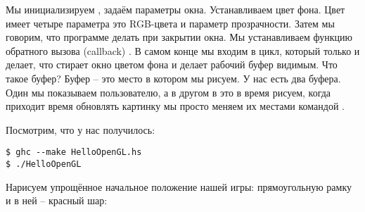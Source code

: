 Мы инициализируем , задаём параметры окна. Устанавливаем цвет
фона. Цвет имеет четыре параметра это RGB-цвета и параметр прозрачности.
Затем мы говорим, что программе делать при закрытии окна. Мы
устанавливаем функцию обратного вызова (callback)
. В самом конце мы входим в цикл, который только
и делает, что стирает окно цветом фона и делает рабочий буфер видимым.
Что такое буфер? Буфер -- это место в котором мы рисуем. У нас есть два
буфера. Один мы показываем пользователю, а в другом в это в время
рисуем, когда приходит время обновлять картинку мы просто меняем их
местами командой .

Посмотрим, что у нас получилось:


\begin{verbatim}
$ ghc --make HelloOpenGL.hs
$ ./HelloOpenGL
\end{verbatim}

Нарисуем упрощённое начальное положение нашей игры: прямоугольную рамку
и в ней -- красный шар:


